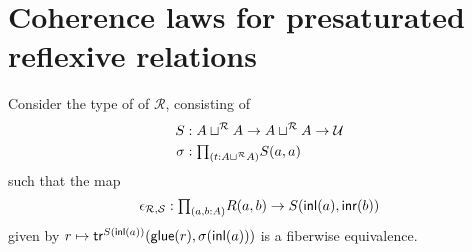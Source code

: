 \section{Coherence laws for presaturated reflexive relations}
Consider the type of  of $\mathcal{R}$, consisting of
\begin{align*}
S & : A\sqcup^{\mathcal{R}}A \to A\sqcup^{\mathcal{R}} A \to \UU \\
\sigma & : \prd{t:A\sqcup^{\mathcal{R}} A} S(a,a)
\end{align*}
such that the map
\begin{equation*}
\epsilon_{\mathcal{R},\mathcal{S}} : \prd{a,b:A}R(a,b)\to S(\inl(a),\inr(b))
\end{equation*}
given by $r\mapsto \mathsf{tr}^{S({\mathsf{inl}}(a))}(\mathsf{glue}(r),\sigma({\mathsf{inl}}(a)))$ is a fiberwise equivalence.

